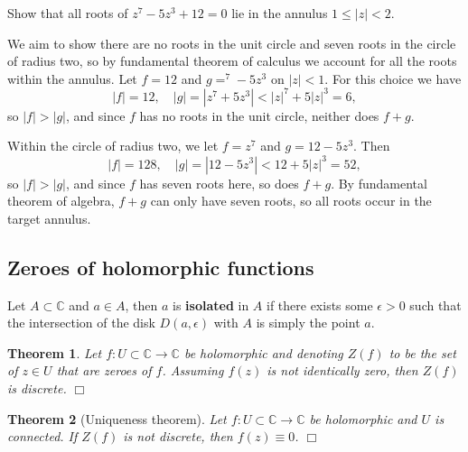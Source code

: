 \documentclass[letter-paper]{tufte-book}
\newtheorem{theorem}{\color{pastel-blue}Theorem}[section]
\newenvironment{example}[1][Example]{\begin{trivlist}
\item[\hskip \labelsep {\bfseries #1}]}{\end{trivlist}}
\newcommand{\qedwhite}{\hfill \ensuremath{\Box}}
\begin{document}
\begin{example}
  Show that all roots of $z^7 - 5z^3 + 12 = 0$ lie in the annulus $1 \leq |z| <
  2$.
  
  We aim to show there are no roots in the unit circle and seven roots in the
  circle of radius two, so by fundamental theorem of calculus we account for all
  the roots within the annulus. Let $f = 12$ and $g = ^7 - 5z^3$ on $|z| < 1$.
  For this choice we have
  \begin{equation*}
    |f| = 12, \quad |g| = |z^7 + 5z^3| < |z|^7 + 5|z|^3 = 6,
  \end{equation*}
  so $|f| > |g|$, and since $f$ has no roots in the unit circle, neither does
  $f+g$.
  
  Within the circle of radius two, we let $f = z^7$ and $g = 12 - 5z^3$. Then
  \begin{equation*}
    |f| = 128, \quad |g| = |12 - 5z^3| < 12 + 5|z|^3 = 52,
  \end{equation*}
  so $|f| > |g|$, and since $f$ has seven roots here, so does $f+g$. By
  fundamental theorem of algebra, $f+g$ can only have seven roots, so all roots
  occur in the target annulus.
\end{example}


\subsection{Zeroes of holomorphic functions}

Let $A\subset \mathbb{C}$ and $a\in A$, then $a$ is \textbf{isolated} in $A$ if
there exists some $\epsilon > 0$ such that the intersection of the disk $D(a,
\epsilon)$ with $A$ is simply the point $a$.

\begin{theorem}
  Let $f: U \subset \mathbb{C} \to \mathbb{C}$ be holomorphic and denoting
  $Z(f)$ to be the set of $z\in U$ that are zeroes of $f$. Assuming $f(z)$ is
  not identically zero, then $Z(f)$ is discrete. \qedwhite
\end{theorem}

\begin{theorem}[Uniqueness theorem]
   Let $f: U \subset \mathbb{C} \to \mathbb{C}$ be holomorphic and $U$ is
   connected. If $Z(f)$ is not discrete, then $f(z) \equiv 0$. \qedwhite
\end{theorem}
\end{document}
